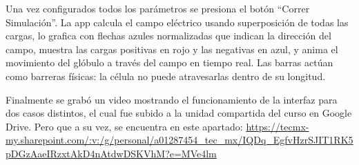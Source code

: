 \tab Una vez configurados todos los parámetros se presiona el botón “Correr Simulación”. La app calcula el campo eléctrico usando superposición de todas las cargas, lo grafica con flechas azules normalizadas que indican la dirección del campo, muestra las cargas positivas en rojo y las negativas en azul, y anima el movimiento del glóbulo a través del campo en tiempo real. Las barras actúan como barreras físicas: la célula no puede atravesarlas dentro de su longitud.

\tab Finalmente se grabó un video mostrando el funcionamiento de la interfaz para dos casos distintos, el cual fue subido a la unidad compartida del curso en Google Drive. Pero que a su vez, se encuentra en este apartado: \url{https://tecmx-my.sharepoint.com/:v:/g/personal/a01287454_tec_mx/IQDq_EgfvHzrSJIT1RK5pDGzAaeIRzxtAkD4nAtdwDSKVhM?e=MVe4lm}
